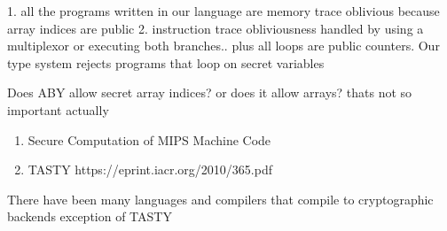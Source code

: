  1. all the programs written in our language are memory trace oblivious because array indices are public 2. instruction trace obliviousness handled by using a multiplexor or executing both branches.. plus all loops are public counters. Our type system rejects programs that loop on secret variables

 Does ABY allow secret array indices? or does it allow arrays? thats not so important actually

\begin{enumerate}
\item Secure Computation of MIPS Machine Code %
\item TASTY https://eprint.iacr.org/2010/365.pdf

\end{enumerate}


There have been many languages and compilers that compile to cryptographic backends
exception of TASTY
\newpage